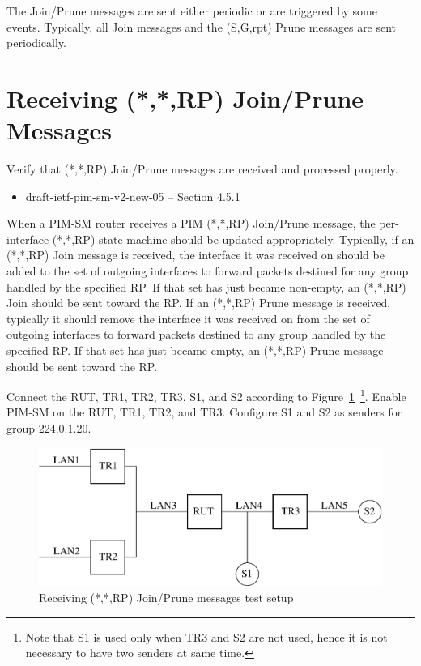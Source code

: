 \documentclass[11pt]{report}
\begin{document}
The Join/Prune messages are sent either periodic or are triggered by
some events. Typically, all Join messages and the (S,G,rpt) Prune
messages are sent periodically.

\newpage
\section{Receiving (*,*,RP) Join/Prune Messages}

Verify that (*,*,RP) Join/Prune messages are received and processed
properly.

\begin{itemize}
  \item draft-ietf-pim-sm-v2-new-05 -- Section 4.5.1
\end{itemize}

When a PIM-SM router receives a PIM (*,*,RP) Join/Prune message, the
per-interface (*,*,RP) state machine should be updated appropriately.
Typically, if an (*,*,RP) Join message is received, the interface it was
received on should be added to the set of outgoing interfaces to
forward packets destined for any group handled by the specified RP.
If that set has just became non-empty, an (*,*,RP) Join should be sent
toward the RP.
If an (*,*,RP) Prune message is received, typically it should remove
the interface it was received on from the set of outgoing interfaces
to forward packets destined to any group handled by the specified RP. If
that set has just became empty, an (*,*,RP) Prune message should be
sent toward the RP.

Connect the RUT, TR1, TR2, TR3, S1, and S2 according to
Figure~\ref{fig:pim_test_4_1_receiving_rp_join_prune_messages}~\footnote{Note
that S1 is used only when TR3 and S2 are not used, hence it is not necessary
to have two senders at same time.}.
Enable PIM-SM on the RUT, TR1, TR2, and TR3.
Configure S1 and S2 as senders for group 224.0.1.20.

\begin{figure}[htbp]
  \begin{center}
    \includegraphics[scale=0.8]{figs/pim_test_4_1_receiving_rp_join_prune_messages}
    \caption{Receiving (*,*,RP) Join/Prune messages test setup}
    \label{fig:pim_test_4_1_receiving_rp_join_prune_messages}
  \end{center}
\end{figure}
\end{document}
